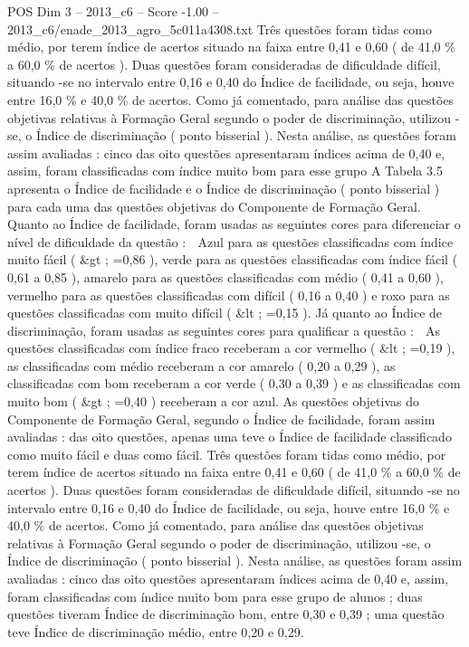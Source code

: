 \begin{textsample}{POS Dim 3 – 2013\_c6 – Score -1.00 – 2013\_c6/enade\_2013\_agro\_5c011a4308.txt}
Três questões foram tidas como médio, por terem índice de acertos situado na faixa entre 0,41 e 0,60 ( de 41,0 \% a 60,0 \% de acertos ).
Duas questões foram consideradas de dificuldade difícil, situando -se no intervalo entre 0,16 e 0,40 do Índice de facilidade, ou seja, houve entre 16,0 \% e 40,0 \% de acertos.
Como já comentado, para análise das questões objetivas relativas à Formação Geral segundo o poder de discriminação, utilizou -se, o Índice de discriminação ( ponto bisserial ).
Nesta análise, as questões foram assim avaliadas : cinco das oito questões apresentaram índices acima de 0,40 e, assim, foram classificadas com índice muito bom para esse grupo A Tabela 3.5 apresenta o Índice de facilidade e o Índice de discriminação ( ponto bisserial ) para cada uma das questões objetivas do Componente de Formação Geral.
Quanto ao Índice de facilidade, foram usadas as seguintes cores para diferenciar o nível de dificuldade da questão :  Azul para as questões classificadas com índice muito fácil ( \&gt ; =0,86 ), verde para as questões classificadas com índice fácil ( 0,61 a 0,85 ), amarelo para as questões classificadas com médio ( 0,41 a 0,60 ), vermelho para as questões classificadas com difícil ( 0,16 a 0,40 ) e roxo para as questões classificadas com muito difícil ( \&lt ; =0,15 ).
Já quanto ao Índice de discriminação, foram usadas as seguintes cores para qualificar a questão :  As questões classificadas com índice fraco receberam a cor vermelho ( \&lt ; =0,19 ), as classificadas com médio receberam a cor amarelo ( 0,20 a 0,29 ), as classificadas com bom receberam a cor verde ( 0,30 a 0,39 ) e as classificadas com muito bom ( \&gt ; =0,40 ) receberam a cor azul.
As questões objetivas do Componente de Formação Geral, segundo o Índice de facilidade, foram assim avaliadas : das oito questões, apenas uma teve o Índice de facilidade classificado como muito fácil e duas como fácil.
Três questões foram tidas como médio, por terem índice de acertos situado na faixa entre 0,41 e 0,60 ( de 41,0 \% a 60,0 \% de acertos ).
Duas questões foram consideradas de dificuldade difícil, situando -se no intervalo entre 0,16 e 0,40 do Índice de facilidade, ou seja, houve entre 16,0 \% e 40,0 \% de acertos.
Como já comentado, para análise das questões objetivas relativas à Formação Geral segundo o poder de discriminação, utilizou -se, o Índice de discriminação ( ponto bisserial ).
Nesta análise, as questões foram assim avaliadas : cinco das oito questões apresentaram índices acima de 0,40 e, assim, foram classificadas com índice muito bom para esse grupo de alunos ; duas questões tiveram Índice de discriminação bom, entre 0,30 e 0,39 ; uma questão teve Índice de discriminação médio, entre 0,20 e 0,29.

\end{textsample}
